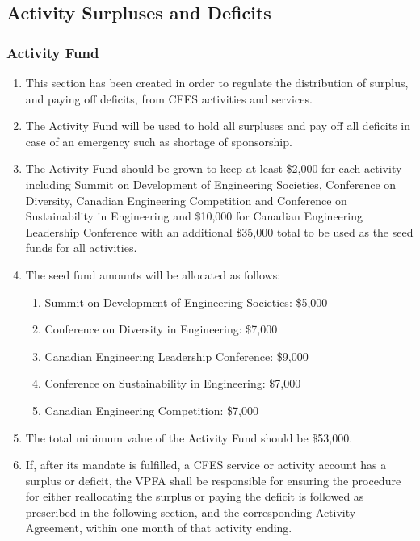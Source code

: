 \subsection{Activity Surpluses and Deficits}
\label{activity-surpluses-and-deficits}

\subsubsection{Activity Fund}
\label{activity-fund}

\begin{enumerate}
 \item
  This section has been created in order to regulate the distribution of surplus, and paying off deficits, from CFES activities and services.
 \item
  The Activity Fund will be used to hold all surpluses and pay off all deficits in case of an emergency such as shortage of sponsorship.
 \item
  The Activity Fund should be grown to keep at least \$2,000 for each activity including Summit on Development of Engineering Societies, Conference on Diversity, Canadian Engineering Competition and Conference on Sustainability in Engineering and \$10,000 for Canadian Engineering Leadership Conference with an additional \$35,000 total to be used as the seed funds for all activities.
 \item
  The seed fund amounts will be allocated as follows:

  \begin{enumerate}
   \item
    Summit on Development of Engineering Societies: \$5,000
   \item
    Conference on Diversity in Engineering: \$7,000
   \item
    Canadian Engineering Leadership Conference: \$9,000
   \item
    Conference on Sustainability in Engineering: \$7,000
   \item
    Canadian Engineering Competition: \$7,000
  \end{enumerate}

 \item
  The total minimum value of the Activity Fund should be \$53,000.
 \item
  If, after its mandate is fulfilled, a CFES service or activity account has a surplus or deficit, the VPFA shall be responsible for ensuring the procedure for either reallocating the surplus or paying the deficit is followed as prescribed in the following section, and the corresponding Activity Agreement, within one month of that activity ending.
\end{enumerate}

